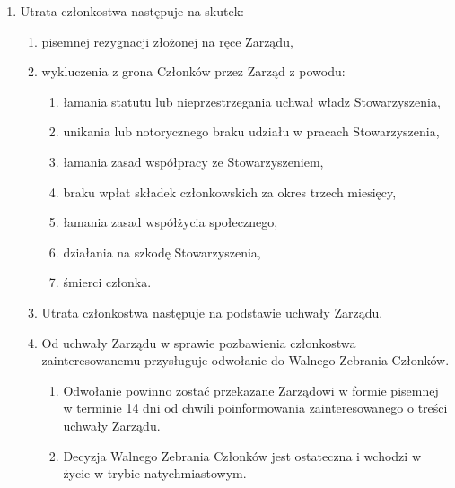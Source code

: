 \documentclass{article}
\begin{document}
\begin{enumerate}
    \item Utrata członkostwa następuje na skutek:
      \begin{enumerate}
        \item pisemnej rezygnacji złożonej na ręce Zarządu,
        \item wykluczenia z grona Członków przez Zarząd z powodu:
          \begin{enumerate}
            \item łamania statutu lub nieprzestrzegania uchwał władz Stowarzyszenia,
            \item unikania lub notorycznego braku udziału w pracach Stowarzyszenia,
            \item łamania zasad współpracy ze Stowarzyszeniem,
            \item braku wpłat składek członkowskich za okres trzech miesięcy,
            \item łamania zasad współżycia społecznego,
            \item działania na szkodę Stowarzyszenia,
            \item śmierci członka.
          \end{enumerate}
        \item Utrata członkostwa następuje na podstawie uchwały Zarządu.
        \item Od uchwały Zarządu w sprawie pozbawienia członkostwa zainteresowanemu przysługuje odwołanie do Walnego Zebrania Członków.
          \begin{enumerate}
            \item Odwołanie powinno zostać przekazane Zarządowi w formie pisemnej w terminie 14 dni od chwili poinformowania zainteresowanego o treści uchwały Zarządu.
            \item Decyzja Walnego Zebrania Członków jest ostateczna i wchodzi w życie w trybie natychmiastowym.
          \end{enumerate}
      \end{enumerate}
  \end{enumerate}
\end{document}
